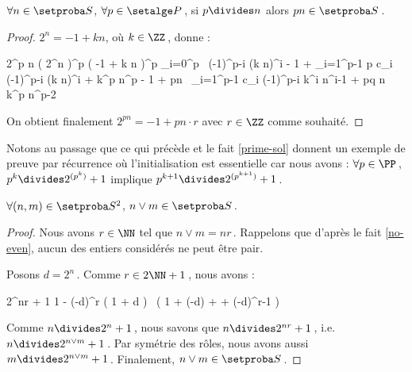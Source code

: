 \begin{fact} \label{prime-divisor}
	$\forall n \in \ourset$, $\forall p \in \primeset$\,,
	si $p \divides n$ alors $p n \in \ourset$\,.
\end{fact}

\begin{proof}
	$2^n = -1 + k n$, où $k \in \ZZ$\,, donne :

    \medskip
    
    \begin{stepcalc}[style=sar]
    	2^{p n}
    \explnext{}
    	\big( 2^n \big)^p
    \explnext{}
    	\big( -1 + k n \big)^p
    \explnext{}
    	\dsum_{i=0}^p  \, (-1)^{p-i} \cdot (k n)^i
    	- 1 + \dsum_{i=1}^{p-1} p c_i \cdot (-1)^{p-i} \cdot (k n)^i + k^p \cdot n^p
    	- 1 + pn \, \dsum_{i=1}^{p-1} c_i \cdot (-1)^{p-i} \cdot k^i n^{i-1} + pq \cdot n \cdot k^p \cdot n^{p-2}
    \end{stepcalc}

    \medskip

    On obtient finalement $2^{p n} = - 1 + pn \cdot r$ avec $r \in \ZZ$ comme souhaité.
\end{proof}




Notons au passage que ce qui précède et le fait \ref{prime-sol} donnent un exemple de preuve par récurrence où l'initialisation est essentielle car nous avons :
$\forall p \in \PP$\,, $p^k \divides 2^{( p^k )} + 1$ 
implique
$p^{k+1} \divides 2^{( p^{k+1} )} + 1$\,.




\begin{fact} \label{lcm}
	$\forall (n , m) \in \ourset^2$, $n \vee m \in \ourset$\,.
\end{fact}

\begin{proof}
	Nous avons $r \in \NN$ tel que $n \vee m = n r$\,. Rappelons que d'après le fait \ref{no-even}, aucun des entiers considérés ne peut être pair.
	
	\medskip
	
	Posons $d = 2^n$\,. Comme $r \in 2 \NN + 1$\,, nous avons :
	
	\medskip
	
	\begin{stepcalc}[style = ar*]
		2^{nr} + 1
		1 - (-d)^r
	\explnext{}
		\big( 1 + d \big) \, \big( 1 + (-d) + \cdots + (-d)^{r-1} \big)
	\end{stepcalc}
	
	\medskip
	
	Comme $n \divides 2^n + 1$\,, nous savons que $n \divides 2^{nr} + 1$\,, i.e. $n \divides 2^{n \vee m} + 1$\,.
	Par symétrie des rôles, nous avons aussi $m \divides 2^{n \vee m} + 1$\,.
	Finalement, $n \vee m \in \ourset$\,.
\end{proof}


